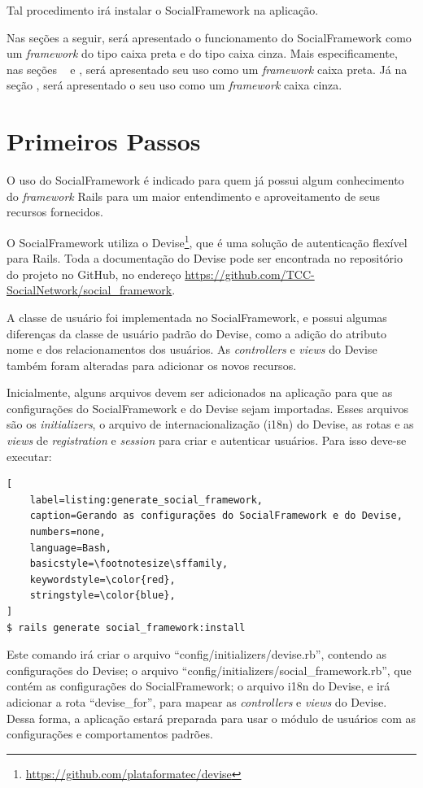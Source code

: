 Tal procedimento irá instalar o SocialFramework na aplicação.

Nas seções a seguir, será apresentado o funcionamento do SocialFramework como um \textit{framework} do tipo caixa preta e do tipo caixa cinza. Mais especificamente, nas seções ~ e , será apresentado seu uso como um \textit{framework} caixa preta. Já na seção , será apresentado o seu uso como um \textit{framework} caixa cinza.

\section{Primeiros Passos}
\label{sec:primeiros_passos}

O uso do SocialFramework é indicado para quem já possui algum conhecimento do \textit{framework} Rails para um maior entendimento e aproveitamento de seus recursos fornecidos.

O SocialFramework utiliza o Devise\footnote{\url{https://github.com/plataformatec/devise}}, que é uma solução de autenticação flexível para Rails. Toda a documentação do Devise pode ser encontrada no repositório do projeto no GitHub, no endereço \url{https://github.com/TCC-SocialNetwork/social_framework}.

A classe de usuário foi implementada no SocialFramework, e possui algumas diferenças da classe de usuário padrão do Devise, como a adição do atributo nome e dos relacionamentos dos usuários. As \textit{controllers} e \textit{views} do Devise também foram alteradas para adicionar os novos recursos.

Inicialmente, alguns arquivos devem ser adicionados na aplicação para que as configurações do SocialFramework e do Devise sejam importadas. Esses arquivos são os \textit{initializers}, o arquivo de internacionalização (i18n) do Devise, as rotas e as \textit{views} de \textit{registration} e \textit{session} para criar e autenticar usuários. Para isso deve-se executar:

\begin{lstlisting}[
    label=listing:generate_social_framework,
    caption=Gerando as configurações do SocialFramework e do Devise,
    numbers=none,
    language=Bash,
    basicstyle=\footnotesize\sffamily,
    keywordstyle=\color{red},
    stringstyle=\color{blue},
]
$ rails generate social_framework:install
\end{lstlisting}

Este comando irá criar o arquivo ``config/initializers/devise.rb'', contendo as configurações do Devise; o arquivo ``config/initializers/social\_framework.rb'', que contém as configurações do SocialFramework; o arquivo i18n do Devise, e irá adicionar a rota ``devise\_for'', para mapear as \textit{controllers} e \textit{views} do Devise. Dessa forma, a aplicação estará preparada para usar o módulo de usuários com as configurações e comportamentos padrões.

